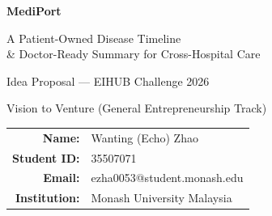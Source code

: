 \begin{titlepage}
\centering
\vspace*{2.2cm}
{\Huge\bfseries\color{woof} MediPort\par}
\vspace{0.5cm}
{\LARGE\color{woofdark} A Patient-Owned Disease Timeline\\[3pt] \& Doctor-Ready Summary for Cross-Hospital Care\par}
\vspace{1.0cm}
{\large Idea Proposal --- EIHUB Challenge 2026\par}
{\large Vision to Venture (General Entrepreneurship Track)\par}
\vfill
{\large
\begin{tabular}{rl}
\textbf{Name:} & Wanting (Echo) Zhao\\[3pt]
\textbf{Student ID:} & 35507071\\[3pt]
\textbf{Email:} & ezha0053@student.monash.edu\\[3pt]
\textbf{Institution:} & Monash University Malaysia\\
\end{tabular}\par}
\vspace{1.5cm}
\end{titlepage}
